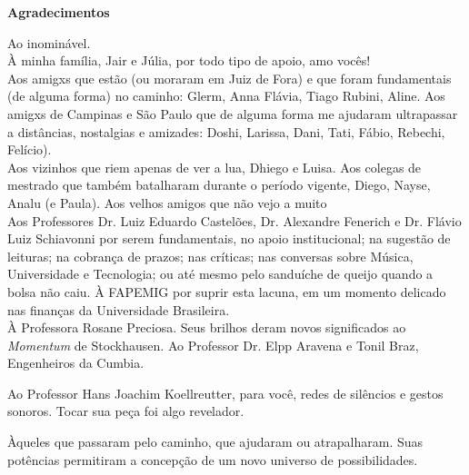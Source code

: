 \newpage
\begin{flushright}
\huge{\textbf{Agradecimentos}}

\small{Ao inominável.
\ \\
À minha família, Jair e Júlia, por todo tipo de apoio, amo vocês! 
\ \\
 Aos amigxs que estão (ou moraram em Juiz de Fora) e que foram fundamentais (de alguma forma) no caminho: Glerm, Anna Flávia, Tiago Rubini, Aline. Aos amigxs de Campinas e São Paulo que de alguma forma me ajudaram ultrapassar a distâncias, nostalgias e amizades: Doshi, Larissa, Dani, Tati, Fábio, Rebechi, Felício).
\ \\
Aos vizinhos que riem apenas de ver a lua, Dhiego e Luisa. Aos colegas de mestrado que também batalharam durante o período vigente, Diego, Nayse, Analu (e Paula). Aos velhos amigos que não vejo a muito
\ \\
Aos Professores Dr. Luiz Eduardo Castelões, Dr. Alexandre Fenerich e Dr. Flávio Luiz Schiavonni por serem fundamentais, no apoio institucional; na sugestão de leituras; na cobrança de prazos; nas críticas; nas conversas sobre Música, Universidade e Tecnologia; ou até mesmo pelo sanduíche de queijo quando a bolsa não caiu. À FAPEMIG por suprir esta lacuna, em um momento delicado nas finanças da Universidade Brasileira.
\ \\
À Professora Rosane Preciosa. Seus brilhos deram novos significados ao \emph{Momentum} de Stockhausen. Ao Professor Dr. Elpp Aravena e Tonil Braz, Engenheiros da Cumbia.

Ao Professor Hans Joachim Koellreutter, para você, redes de silêncios e gestos sonoros. Tocar sua peça foi algo revelador.

Àqueles que passaram pelo caminho, que ajudaram ou atrapalharam. Suas potências permitiram a concepção de um novo universo de possibilidades.}
\end{flushright}

\vfil \ 

\newpage